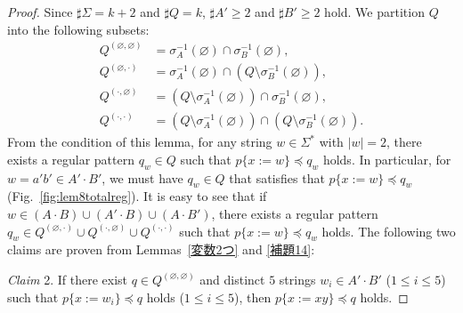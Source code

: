 \begin{proof}
Since $\sharp \Sigma = k + 2$ and $\sharp Q = k$, $\sharp A' \geq 2$ and $\sharp B' \geq 2$ hold.
We partition $Q$ into the following subsets:
\begin{align*}
  Q^{(\varnothing,\varnothing)} & = \sigma_{A}^{-1}(\varnothing) \cap \sigma_{B}^{-1}(\varnothing),\\
  Q^{(\varnothing,\cdot)} & = \sigma_{A}^{-1}(\varnothing) \cap (Q\setminus \sigma_{B}^{-1}(\varnothing)),\\
  Q^{(\cdot,\varnothing)} & = (Q\setminus \sigma_{A}^{-1}(\varnothing)) \cap \sigma_{B}^{-1}(\varnothing),\\
  Q^{(\cdot,\cdot)} & = (Q\setminus \sigma_{A}^{-1}(\varnothing)) \cap (Q\setminus \sigma_{B}^{-1}(\varnothing)).
\end{align*}
From the condition of this lemma, for any string $w \in \Sigma^{\ast}$ with $|w|=2$, there exists a regular pattern $q_{w} \in Q$ such that $p \{ x:=w \} \preceq q_{w}$ holds.
In particular, for $w=a'b'\in A'\cdot B'$, we must have $q_{w} \in Q$ that satisfies that $p \{ x:=w \} \preceq q_{w}$ (Fig.~\ref{fig:lem8totalreg}).
It is easy to see that if $w \in (A\cdot B) \cup (A'\cdot B) \cup (A\cdot B')$, there exists a regular pattern $q_{w} \in Q^{(\varnothing,\cdot)} \cup Q^{(\cdot,\varnothing)} \cup Q^{(\cdot,\cdot)}$ such that $p \{ x:=w \} \preceq q_{w}$ holds.
The following two claims are proven from Lemmas~\ref{変数2つ} and \ref{補題14}:

\smallskip

\noindent
\textit{Claim} 2. If there exist $q \in Q^{(\varnothing,\varnothing)}$ and distinct $5$ strings $w_{i} \in A'\cdot B'$ ($1\leq i\leq 5$) such  that $p \{ x:=w_{i} \} \preceq q$ holds ($1\leq i\leq 5$),  then $p \{ x:=xy \} \preceq q$ holds.

\smallskip


\end{proof}

